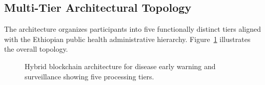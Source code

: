 \subsection{Multi-Tier Architectural Topology}\label{subsec:topology}

The architecture organizes participants into five functionally distinct tiers aligned with the Ethiopian public health administrative hierarchy. Figure~\ref{fig:architecture} illustrates the overall topology.

\begin{figure}[!ht]
\centering
{}
\caption{Hybrid blockchain architecture for disease early warning and surveillance showing five processing tiers.}\label{fig:architecture}
\end{figure}

%
%
%
%
%
%
%

